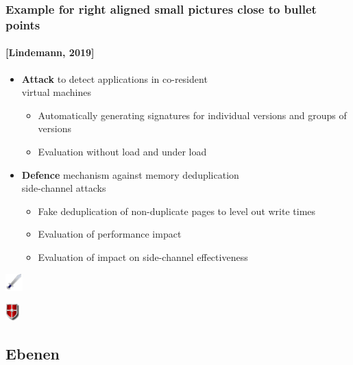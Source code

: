\documentclass[t]{beamer}
\begin{document}
\begin{frame}
	\frametitle{Example for right aligned small pictures close to bullet points}
	\framesubtitle{[Lindemann, 2019] }
	\begin{itemize}
		\item \textbf{Attack} to detect applications in co-resident \\ virtual machines 
		\begin{itemize}
			\item Automatically generating signatures for individual versions and groups of versions
			\item Evaluation without load and under load
		\end{itemize}
		\item \medskip \textbf{Defence} mechanism against memory deduplication \\ side-channel attacks
		\begin{itemize}
			\item Fake deduplication of non-duplicate pages to level out write times
			\item Evaluation of performance impact
			\item Evaluation of impact on side-channel effectiveness
		\end{itemize}
	\end{itemize}
	\raggedleft %
	\par\vspace{-6.0cm} %
	\includegraphics[height=25px]{../pic/sword.pdf} %
	\par\vspace{1.8cm} %
	\includegraphics[height=25px]{../pic/shield.pdf} %
\end{frame}

\subsection{Ebenen} %
\end{document}

